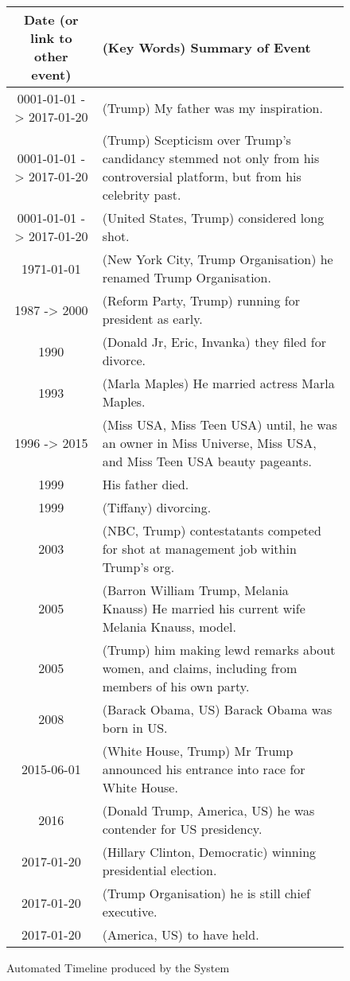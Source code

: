 \begin{figure}[H]
\begin{tabular}{|c|p{8.5cm}|}
\hline
Date (or link to other event) & (Key Words)  Summary of Event\\
\hline
\hline
0001-01-01 -> 2017-01-20 & (Trump) My father was my inspiration.\\
\hline
0001-01-01 -> 2017-01-20 & (Trump) Scepticism over Trump's candidancy stemmed not only from his controversial platform, but from his celebrity past.\\
\hline
0001-01-01 -> 2017-01-20 & (United States, Trump) considered long shot.\\
\hline
1971-01-01 & (New York City, Trump Organisation) he renamed Trump Organisation.\\
\hline
1987 -> 2000 & (Reform Party, Trump) running for president as early.\\
\hline
1990 & (Donald Jr, Eric, Invanka) they filed for divorce.\\
\hline
1993 & (Marla Maples) He married actress Marla Maples.\\
\hline
1996 -> 2015 & (Miss USA, Miss Teen USA) until, he was an owner in Miss Universe, Miss USA, and Miss Teen USA beauty pageants.\\
\hline
1999 & His father died.\\
\hline
1999 & (Tiffany) divorcing.\\
\hline
2003 & (NBC, Trump) contestatants competed for shot at management job within Trump's org.\\
\hline
2005 & (Barron William Trump, Melania Knauss) He married his current wife Melania Knauss, model.\\
\hline
2005 & (Trump) him making lewd remarks about women, and claims, including from members of his own party.\\
\hline
2008 & (Barack Obama, US) Barack Obama was born in US.\\
\hline
2015-06-01 & (White House, Trump) Mr Trump announced his entrance into race for White House.\\
\hline
2016 & (Donald Trump, America, US) he was contender for US presidency.\\
\hline
2017-01-20 & (Hillary Clinton, Democratic) winning presidential election.\\
\hline
2017-01-20 & (Trump Organisation) he is still chief executive.\\
\hline
2017-01-20 & (America, US) to have held.\\
\hline
\end{tabular}
\caption{Automated Timeline produced by the System}
\end{figure}

